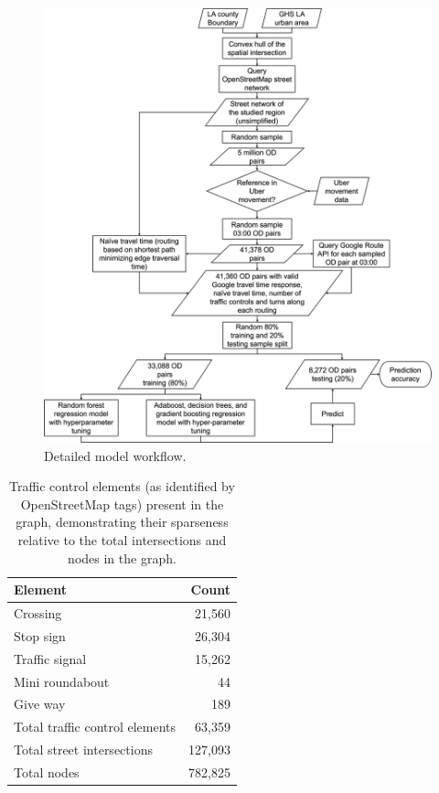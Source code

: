 \documentclass[12pt,letterpaper]{article} %
\begin{document}
\begin{figure}[bt!]
    \centering
    \includegraphics[width=1.0\textwidth]{fig_workflow.jpg}
    \caption{Detailed model workflow.}\label{fig:workflow}
\end{figure}

\begin{table}[tb!]
    \centering
    \caption{Traffic control elements (as identified by OpenStreetMap tags) present in the graph, demonstrating their sparseness relative to the total intersections and nodes in the graph.}\label{tab:traffic_control_counts}
    \begin{tabular}{lr}
        \toprule
        Element                        &   Count \\
        \midrule
        Crossing                       &  21,560 \\
        Stop sign                      &  26,304 \\
        Traffic signal                 &  15,262 \\
        Mini roundabout                &      44 \\
        Give way                       &     189 \\
        \midrule
        Total traffic control elements &  63,359 \\
        Total street intersections     & 127,093 \\
        Total nodes                    & 782,825 \\
        \bottomrule
    \end{tabular}
\end{table}
\end{document}
